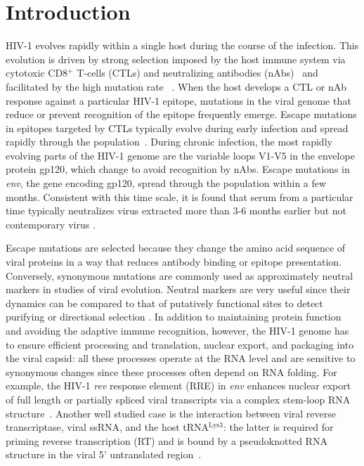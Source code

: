 \documentclass[rmp, twocolumn]{revtex4}
\newcommand{\rev}{\textit{rev}}
\newcommand{\env}{\textit{env}}
\begin{document}
\section{Introduction}
HIV-1 evolves rapidly within a single host during the course of the infection.
This evolution is driven by strong selection imposed by the host immune system
via cytotoxic CD8${}^+$ T-cells (CTLs) and neutralizing antibodies
(nAbs)~\citep{rambaut_causes_2004} and facilitated by the high mutation rate
~\citep{mansky_lower_1995,abram_nature_2010}. When the host develops a CTL or
nAb response against a particular HIV-1 epitope, mutations in the viral genome that
reduce or prevent recognition of the epitope frequently emerge. Escape mutations
in epitopes targeted by CTLs typically evolve during early infection and spread
rapidly through the population~\citep{mcmichael_immune_2009}. During chronic
infection, the most rapidly evolving parts of the HIV-1 genome are the variable
loops V1-V5 in the envelope protein gp120, which change to avoid recognition by
nAbs. Escape mutations in \env, the gene encoding gp120, spread through the
population within a few months.
Consistent with this time scale, it is found that serum from a particular time
typically neutralizes virus extracted more than 3-6 months earlier but not contemporary
virus \citep{richman_rapid_2003}.

Escape mutations are selected because they change the amino acid sequence
of viral proteins in a way that reduces antibody binding or epitope presentation. 
Conversely, synonymous mutations are commonly used as
approximately neutral markers in studies of viral evolution. Neutral markers are
very useful since their dynamics can be compared to that of putatively
functional sites to detect purifying or directional selection
\citep{Bhatt:2011p43255,Hurst:2002p32608,Chen:2004p22606}. In addition to
maintaining protein function and avoiding the adaptive immune recognition,
however, the HIV-1 genome has to ensure efficient processing and translation,
nuclear export, and packaging into the viral capsid: all these processes operate
at the RNA level and are sensitive to synonymous changes since these processes
often depend on RNA folding. For example, the HIV-1 \rev{} response element (RRE)
in \env{} enhances nuclear export of full length or partially spliced viral
transcripts via a complex stem-loop RNA structure~\citep{fernandes_hiv-1_2012}.
Another well studied case is the interaction between viral reverse
transcriptase, viral ssRNA, and the host tRNA$^\text{Lys3}$: the latter is
required for priming reverse transcription (RT) and is bound by a pseudoknotted
RNA structure in the viral 5' untranslated region~\citep{barat_interaction_1991,
paillart_vitro_2002}.
\end{document}
